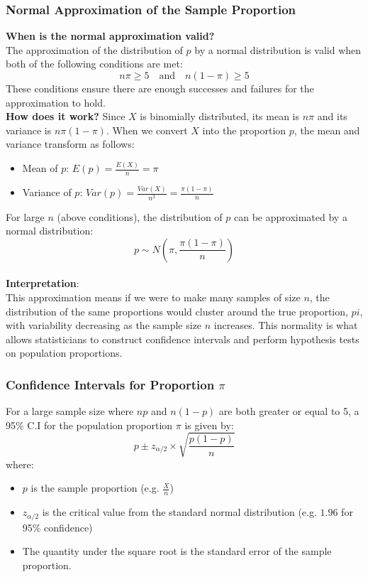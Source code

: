 \documentclass[9pt]{extarticle}
\begin{document}
\subsubsection{Normal Approximation of the Sample Proportion}
\textbf{When is the normal approximation valid?}\\
The approximation of the distribution of $p$ by a normal distribution is valid when both of the following conditions are met:   
$$n\pi \geq 5 \quad \text{and} \quad n(1 - \pi) \geq 5$$
These conditions ensure there are enough successes and failures for the approximation to hold. \\[2ex]
\textbf{How does it work?}
Since $X$ is binomially distributed, its mean is $n\pi$ and its variance is $n\pi(1 - \pi)$. When we convert $X$ into the proportion $p$, the mean and variance transform as follows:
\begin{itemize}
    \item Mean of $p$: $E(p) = \frac{E(X)}{n} = \pi$
    \item Variance of $p$: $Var(p) = \frac{Var(X)}{n^2} = \frac{\pi(1 - \pi)}{n}$
\end{itemize}
For large $n$ (above conditions), the distribution of $p$ can be approximated by a normal distribution:
$$p \sim N\left(\pi, \frac{\pi(1 - \pi)}{n}\right)$$\\
\textbf{Interpretation}: \\
This approximation means if we were to make many samples of size $n$, the distribution of the same proportions would cluster around the true proportion, $pi$, with variability decreasing as the sample size $n$ increases. This normality is what allows statisticians to construct confidence intervals and perform hypothesis tests on population proportions.
\subsubsection{Confidence Intervals for Proportion $\pi$}
For a large sample size where $np$ and $n(1-p)$ are both greater or equal to 5, a 95\% C.I for the population proportion $\pi$ is given by:
$$p \pm z_{\alpha/2} \times \sqrt{\frac{p(1 - p)}{n}}$$
where:
\begin{itemize}
    \item $p$ is the sample proportion (e.g. $\frac{X}{n}$)
    \item $z_{\alpha/2}$ is the critical value from the standard normal distribution (e.g. $1.96$ for 95\% confidence)
    \item The quantity under the square root is the standard error of the sample proportion.
\end{itemize}
\end{document}
